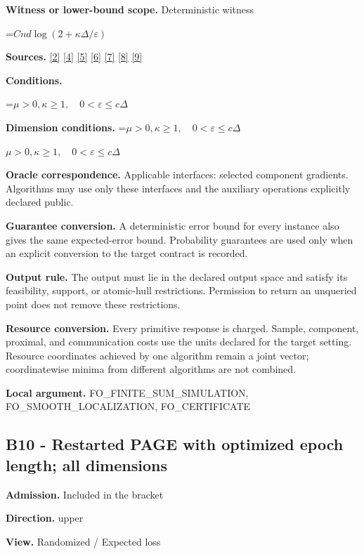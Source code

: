 \documentclass[10pt,a4paper]{article}
\newcommand{\AtlasMath}[1]{\par\begingroup\centering\setbox0=\hbox{$\displaystyle #1$}\ifdim\wd0>1.4\linewidth\typeout{ATLAS WIDE FORMULA: \the\wd0}\fi\ifdim\wd0>\linewidth\resizebox{\linewidth}{!}{\box0}\else\box0\fi\par\endgroup}
\newcommand{\AtlasInlineMath}[1]{\begingroup\setbox0=\hbox{$#1$}\ifdim\wd0>.4\linewidth\endgroup\AtlasMath{#1}\else\endgroup$#1$\fi}
\begin{document}
\textbf{Witness or lower-bound scope.} Deterministic witness

\AtlasMath{Cnd\log(2+\kappa\Delta/\varepsilon)}
\textbf{Sources.} \href{https://proceedings.mlr.press/v97/zhou19b/zhou19b.pdf}{[2]} \href{https://arxiv.org/pdf/1405.4980}{[4]} \href{https://arxiv.org/pdf/2101.09740v2}{[5]} \href{https://arxiv.org/pdf/2609.33360v2}{[6]} \href{https://arxiv.org/pdf/2609.10874}{[7]} \href{https://www2.isye.gatech.edu/~nemirovs/MOR_AccuracyCertificates.pdf}{[8]} \href{https://arxiv.org/pdf/2609.20701}{[9]}

\textbf{Conditions.} 
\AtlasMath{\mu>0,\kappa\ge1,\quad0<\varepsilon\le c\Delta}


\textbf{Dimension conditions.} \AtlasInlineMath{\mu>0,\kappa\ge1,\quad0<\varepsilon\le c\Delta}

\textbf{Oracle correspondence.} Applicable interfaces: selected component gradients. Algorithms may use only these interfaces and the auxiliary operations explicitly declared public.

\textbf{Guarantee conversion.} A deterministic error bound for every instance also gives the same expected-error bound. Probability guarantees are used only when an explicit conversion to the target contract is recorded.

\textbf{Output rule.} The output must lie in the declared output space and satisfy its feasibility, support, or atomic-hull restrictions. Permission to return an unqueried point does not remove these restrictions.

\textbf{Resource conversion.} Every primitive response is charged. Sample, component, proximal, and communication costs use the units declared for the target setting. Resource coordinates achieved by one algorithm remain a joint vector; coordinatewise minima from different algorithms are not combined.

\textbf{Local argument.} FO\_\allowbreak{}FINITE\_\allowbreak{}SUM\_\allowbreak{}SIMULATION, FO\_\allowbreak{}SMOOTH\_\allowbreak{}LOCALIZATION, FO\_\allowbreak{}CERTIFICATE

\subsection{B10 - Restarted PAGE with optimized epoch length; all dimensions}
\textbf{Admission.} Included in the bracket

\textbf{Direction.} upper

\textbf{View.} Randomized / Expected loss
\end{document}
